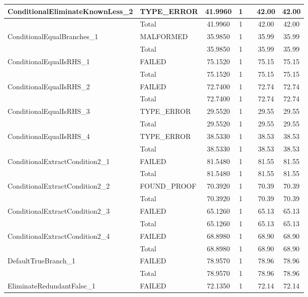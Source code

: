\begin{appendices}
\begin{longtable}{L{0.25\textwidth} L{0.2\textwidth}  c  c  c  c  c }
    ConditionalEliminateKnownLess\_2 & TYPE\_ERROR & 41.9960 & 1 &  & 42.00 & 42.00 \\ \midrule 
    & Total & 41.9960 & 1 &  & 42.00 & 42.00 \\ \midrule 
    ConditionalEqualBranches\_1 & MALFORMED & 35.9850 & 1 &  & 35.99 & 35.99 \\ \midrule 
    & Total & 35.9850 & 1 &  & 35.99 & 35.99 \\ \midrule 
    ConditionalEqualIsRHS\_1 & FAILED & 75.1520 & 1 &  & 75.15 & 75.15 \\ \midrule 
    & Total & 75.1520 & 1 &  & 75.15 & 75.15 \\ \midrule 
    ConditionalEqualIsRHS\_2 & FAILED & 72.7400 & 1 &  & 72.74 & 72.74 \\ \midrule 
    & Total & 72.7400 & 1 &  & 72.74 & 72.74 \\ \midrule 
    ConditionalEqualIsRHS\_3 & TYPE\_ERROR & 29.5520 & 1 &  & 29.55 & 29.55 \\ \midrule 
    & Total & 29.5520 & 1 &  & 29.55 & 29.55 \\ \midrule 
    ConditionalEqualIsRHS\_4 & TYPE\_ERROR & 38.5330 & 1 &  & 38.53 & 38.53 \\ \midrule 
    & Total & 38.5330 & 1 &  & 38.53 & 38.53 \\ \midrule 
    ConditionalExtractCondition2\_1 & FAILED & 81.5480 & 1 &  & 81.55 & 81.55 \\ \midrule 
    & Total & 81.5480 & 1 &  & 81.55 & 81.55 \\ \midrule 
    ConditionalExtractCondition2\_2 & FOUND\_PROOF & 70.3920 & 1 &  & 70.39 & 70.39 \\ \midrule 
    & Total & 70.3920 & 1 &  & 70.39 & 70.39 \\ \midrule 
    ConditionalExtractCondition2\_3 & FAILED & 65.1260 & 1 &  & 65.13 & 65.13 \\ \midrule 
    & Total & 65.1260 & 1 &  & 65.13 & 65.13 \\ \midrule 
    ConditionalExtractCondition2\_4 & FAILED & 68.8980 & 1 &  & 68.90 & 68.90 \\ \midrule 
    & Total & 68.8980 & 1 &  & 68.90 & 68.90 \\ \midrule 
    DefaultTrueBranch\_1 & FAILED & 78.9570 & 1 &  & 78.96 & 78.96 \\ \midrule 
    & Total & 78.9570 & 1 &  & 78.96 & 78.96 \\ \midrule 
    EliminateRedundantFalse\_1 & FAILED & 72.1350 & 1 &  & 72.14 & 72.14 \\ \midrule 

\end{longtable}
\end{appendices}
